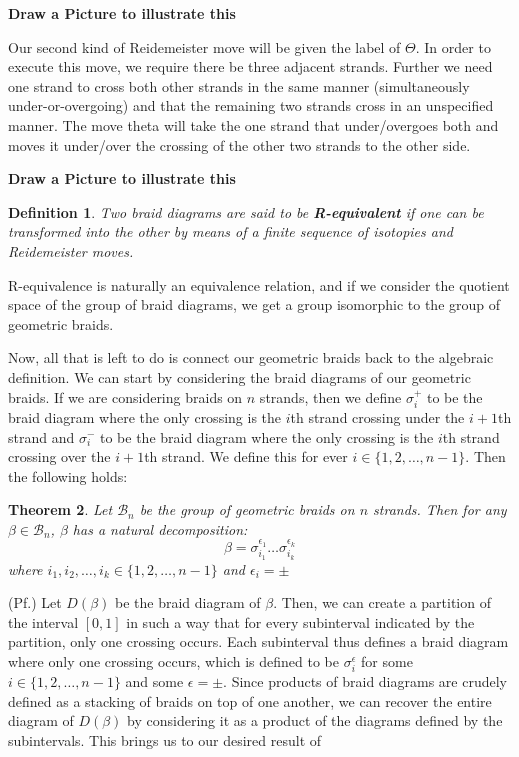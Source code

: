 \documentclass[10pt]{ucthesis}
\newtheorem{definition}{Definition}[chapter]
\newtheorem{theorem}[definition]{Theorem}
\begin{document}
\textbf{Draw a Picture to illustrate this}

Our second kind of Reidemeister move will be given the label of $\Theta$. In order to execute this move, we require there be three adjacent strands. Further we need one strand to cross both other strands in the same manner (simultaneously under-or-overgoing) and that the remaining two strands cross in an unspecified manner. The move theta will take the one strand that under/overgoes both and moves it under/over the crossing of the other two strands to the other side. 

\textbf{Draw a Picture to illustrate this}

\begin{definition}
	Two braid diagrams are said to be \textbf{R-equivalent} if one can be transformed into the other by means of a finite sequence of isotopies and Reidemeister moves.
\end{definition}

R-equivalence is naturally an equivalence relation, and if we consider the quotient space of the group of braid diagrams, we get a group isomorphic to the group of geometric braids.

Now, all that is left to do is connect our geometric braids back to the algebraic definition. We can start by considering the braid diagrams of our geometric braids. If we are considering braids on $n$ strands, then we define $\sigma_i^+$ to be the braid diagram where the only crossing is the $i$th strand crossing under the $i+1$th strand and $\sigma_i^-$ to be the braid diagram where the only crossing is the $i$th strand crossing over the $i+1$th strand. We define this for ever $i\in\{1,2,\hdots,n-1\}$. Then the following holds:

\begin{theorem}
	Let $\mathcal{B}_n$ be the group of geometric braids on $n$ strands. Then for any $\beta\in\mathcal{B}_n$, $\beta$ has a natural decomposition:
$$\beta = \sigma^{\epsilon_1}_{i_1}\hdots\sigma^{\epsilon_k}_{i_k}$$ 
where $i_1,i_2,\hdots,i_k\in\{1,2,\hdots,n-1\}$ and $\epsilon_i = \pm$
\end{theorem}

\noindent (Pf.) Let $D(\beta)$ be the braid diagram of $\beta$. Then, we can create a partition of the interval $[0,1]$ in such a way that for every subinterval indicated by the partition, only one crossing occurs. Each subinterval thus defines a braid diagram where only one crossing occurs, which is defined to be $\sigma_i^\epsilon$ for some $i\in\{1,2,\hdots,n-1\}$ and some $\epsilon = \pm$. Since products of braid diagrams are crudely defined as a stacking of braids on top of one another, we can recover the entire diagram of $D(\beta)$ by considering it as a product of the diagrams defined by the subintervals. This brings us to our desired result of 
\end{document}
